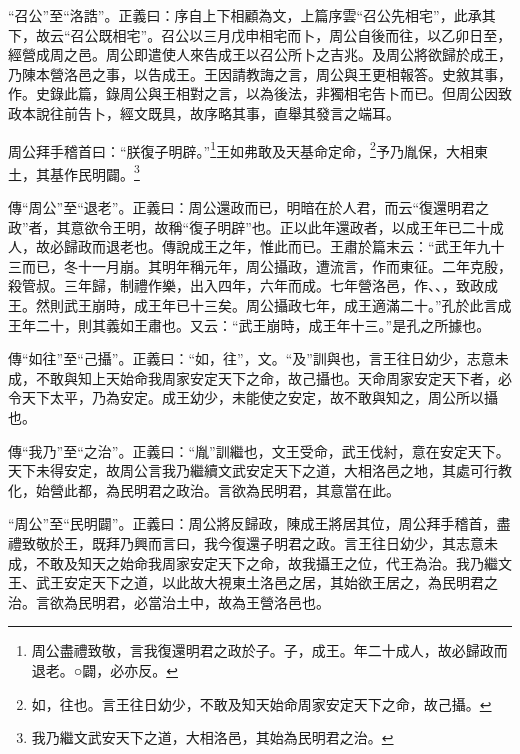 {\noindent\shu{}\fzkt “召公”至“洛誥”。正義曰：序自上下相顧為文，上篇序雲“召公先相宅”，此承其下，故云“召公既相宅”。召公以三月戊申相宅而卜，周公自後而往，以乙卯日至，經營成周之邑。周公即遣使人來告成王以召公所卜之吉兆。及周公將欲歸於成王，乃陳本營洛邑之事，以告成王。王因請教誨之言，周公與王更相報答。史敘其事，作。史錄此篇，錄周公與王相對之言，以為後法，非獨相宅告卜而已。但周公因致政本說往前告卜，經文既具，故序略其事，直舉其發言之端耳。 \par}

周公拜手稽首曰：“朕復子明辟。”\footnote{周公盡禮致敬，言我復還明君之政於子。子，成王。年二十成人，故必歸政而退老。○闢，必亦反。}王如弗敢及天基命定命，\footnote{如，往也。言王往日幼少，不敢及知天始命周家安定天下之命，故己攝。}予乃胤保，大相東土，其基作民明闢。\footnote{我乃繼文武安天下之道，大相洛邑，其始為民明君之治。}


{\noindent\zhuan{}\fzbyks 傳“周公”至“退老”。正義曰：周公還政而已，明暗在於人君，而云“復還明君之政”者，其意欲令王明，故稱“復子明辟”也。正以此年還政者，以成王年已二十成人，故必歸政而退老也。傳說成王之年，惟此而已。王肅於篇末云：“武王年九十三而已，冬十一月崩。其明年稱元年，周公攝政，遭流言，作而東征。二年克殷，殺管叔。三年歸，制禮作樂，出入四年，六年而成。七年營洛邑，作、、，致政成王。然則武王崩時，成王年已十三矣。周公攝政七年，成王適滿二十。”孔於此言成王年二十，則其義如王肅也。又云：“武王崩時，成王年十三。”是孔之所據也。 \par}

{\noindent\zhuan{}\fzbyks 傳“如往”至“己攝”。正義曰：“如，往”，文。“及”訓與也，言王往日幼少，志意未成，不敢與知上天始命我周家安定天下之命，故己攝也。天命周家安定天下者，必令天下太平，乃為安定。成王幼少，未能使之安定，故不敢與知之，周公所以攝也。 \par}

{\noindent\zhuan{}\fzbyks 傳“我乃”至“之治”。正義曰：“胤”訓繼也，文王受命，武王伐紂，意在安定天下。天下未得安定，故周公言我乃繼續文武安定天下之道，大相洛邑之地，其處可行教化，始營此都，為民明君之政治。言欲為民明君，其意當在此。 \par}

{\noindent\shu{}\fzkt “周公”至“民明闢”。正義曰：周公將反歸政，陳成王將居其位，周公拜手稽首，盡禮致敬於王，既拜乃興而言曰，我今復還子明君之政。言王往日幼少，其志意未成，不敢及知天之始命我周家安定天下之命，故我攝王之位，代王為治。我乃繼文王、武王安定天下之道，以此故大視東土洛邑之居，其始欲王居之，為民明君之治。言欲為民明君，必當治土中，故為王營洛邑也。 \par}

